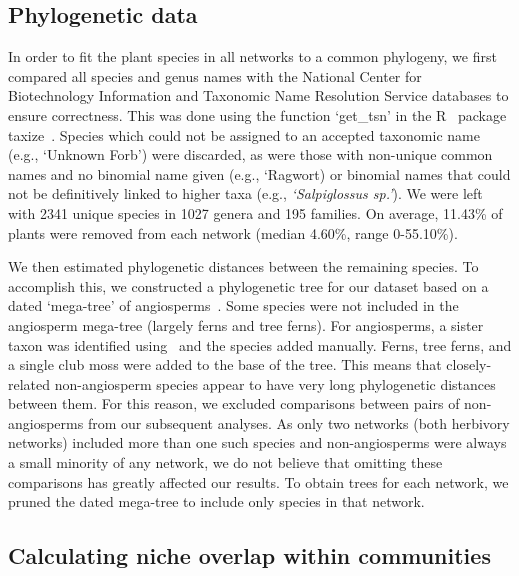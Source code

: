 \documentclass[12pt]{article}
\begin{document}
\begin{spacing}{1.5}
  \subsection*{Phylogenetic data}

    In order to fit the plant species in all networks to a common phylogeny, 
    we first compared all species and genus names with the 
    National Center for Biotechnology Information
    and Taxonomic Name Resolution Service databases to ensure
    correctness. This was done using the function `get\_tsn' in the R~\citep{R}
    package taxize~\citep{taxize1,taxize2}. Species which could not 
    be assigned to an accepted taxonomic name (e.g., `Unknown Forb') were 
    discarded, as were those with non-unique common names and no binomial 
    name given (e.g., `Ragwort) or binomial names that could not be definitively 
    linked to  higher taxa (e.g., \emph{`Salpiglossus sp.'}). We were left with 
    2341 unique species in 1027 genera and 195 families. On average, 11.43\% of 
    plants were removed from each network (median 4.60\%, range 0-55.10\%).


    We then estimated phylogenetic distances between the remaining species. To accomplish 
    this, we constructed a phylogenetic tree for our dataset based on a dated
    `mega-tree' of angiosperms~\citep{Zanne2014}. Some species were not included
    in the angiosperm mega-tree (largely ferns and tree ferns). For angiosperms,
    a sister taxon was identified using~\citet{APW} and the species added manually.
    Ferns, tree ferns, and a single club moss were added to the base of the tree.
    This means that closely-related non-angiosperm species appear to have very long 
    phylogenetic distances between them. For this reason, we excluded comparisons 
    between pairs of non-angiosperms from our subsequent analyses. As only two networks (both 
    herbivory networks) included more than one such species and non-angiosperms
    were always a small minority of any network, we do not 
    believe that omitting these comparisons has greatly affected our results.
    To obtain trees for each network, we 
    pruned the dated mega-tree to include only species in that network.


  \subsection*{Calculating niche overlap within communities}


\end{spacing}
\end{document}

